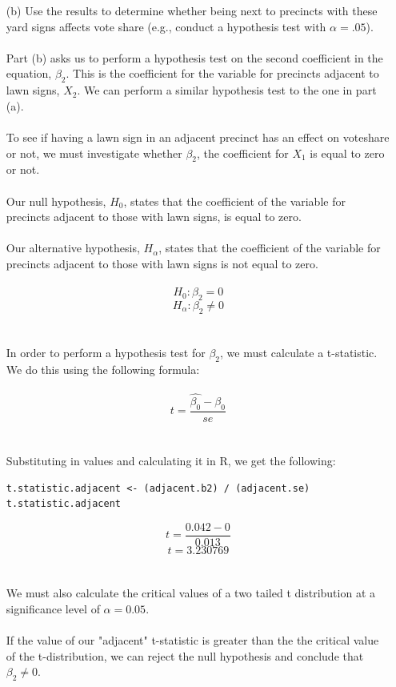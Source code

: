 \documentclass[12pt,letterpaper]{article}
\begin{document}
\begin{enumerate}
	\newpage		
	\item [(b)]  Use the results to determine whether being
	next to precincts with these yard signs affects vote
	share (e.g., conduct a hypothesis test with $\alpha = .05$).
\\\\	
\noindent Part (b) asks us to perform a hypothesis test on the second coefficient in the equation, $\beta_2$. This is the coefficient for the variable for precincts adjacent to lawn signs, $X_2$. We can perform a  similar hypothesis test to the one in part (a).
\\\\
\noindent To see if having a lawn sign in an adjacent precinct has an effect on voteshare or not, we must investigate whether $\beta_2$, the coefficient for $X_1$ is equal to zero or not.
\\\\
\noindent Our null hypothesis, $H_0$, states that the coefficient of the variable for precincts adjacent to those with lawn signs, is equal to zero.
\\\\
\noindent Our alternative hypothesis, $H_\alpha$, states that the coefficient of the variable for precincts adjacent to those with lawn signs is not equal to zero.
\\\\
\[H_0: \beta_2 = 0\]
\[H_\alpha: \beta_2 \neq 0\]
\\\\
In order to perform a hypothesis test for $\beta_2$, we must calculate a t-statistic. We do this using the following formula:
\\\\
\[ t= \frac{\hat{\beta_0} - \beta_0}{se} \]
\\\\
\noindent Substituting in values and calculating it in R, we get the following:
\begin{lstlisting}
t.statistic.adjacent <- (adjacent.b2) / (adjacent.se)
t.statistic.adjacent
\end{lstlisting}
\[ t= \frac{0.042 - 0}{0.013} \]
\[ t= 3.230769\]
\\\\
\noindent We must also calculate the critical values of a two tailed t distribution at a significance level of $\alpha = 0.05$.
\\\\
\noindent If the value of our "adjacent" t-statistic is greater than the the critical value of the t-distribution, we can reject the null hypothesis and conclude that $\beta_2 \neq 0$.

\end{enumerate}
\end{document}
